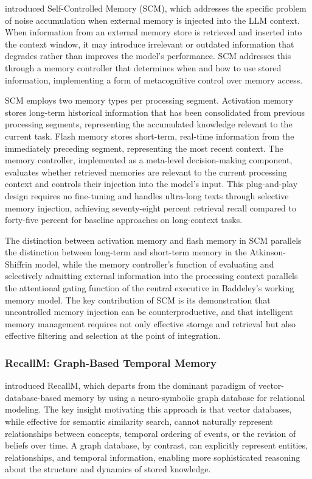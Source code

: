 \documentclass[11pt,letterpaper]{article}
\begin{document}
\cite{liang2023scm} introduced Self-Controlled Memory (SCM), which addresses the specific problem of noise accumulation when external memory is injected into the LLM context. When information from an external memory store is retrieved and inserted into the context window, it may introduce irrelevant or outdated information that degrades rather than improves the model's performance. SCM addresses this through a memory controller that determines when and how to use stored information, implementing a form of metacognitive control over memory access.

SCM employs two memory types per processing segment. Activation memory stores long-term historical information that has been consolidated from previous processing segments, representing the accumulated knowledge relevant to the current task. Flash memory stores short-term, real-time information from the immediately preceding segment, representing the most recent context. The memory controller, implemented as a meta-level decision-making component, evaluates whether retrieved memories are relevant to the current processing context and controls their injection into the model's input. This plug-and-play design requires no fine-tuning and handles ultra-long texts through selective memory injection, achieving seventy-eight percent retrieval recall compared to forty-five percent for baseline approaches on long-context tasks.

The distinction between activation memory and flash memory in SCM parallels the distinction between long-term and short-term memory in the Atkinson-Shiffrin model, while the memory controller's function of evaluating and selectively admitting external information into the processing context parallels the attentional gating function of the central executive in Baddeley's working memory model. The key contribution of SCM is its demonstration that uncontrolled memory injection can be counterproductive, and that intelligent memory management requires not only effective storage and retrieval but also effective filtering and selection at the point of integration.

\subsubsection{RecallM: Graph-Based Temporal Memory}

\cite{kynoch2023recallm} introduced RecallM, which departs from the dominant paradigm of vector-database-based memory by using a neuro-symbolic graph database for relational modeling. The key insight motivating this approach is that vector databases, while effective for semantic similarity search, cannot naturally represent relationships between concepts, temporal ordering of events, or the revision of beliefs over time. A graph database, by contrast, can explicitly represent entities, relationships, and temporal information, enabling more sophisticated reasoning about the structure and dynamics of stored knowledge.
\end{document}
